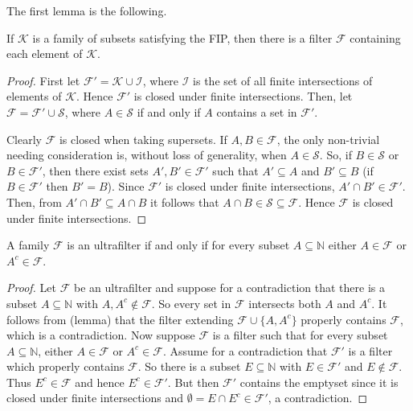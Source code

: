 The first lemma is the following.
\begin{lemma}
 If \( \mathcal{K}  \) is a family of subsets satisfying the FIP, then there is a filter \(  \mathcal{F}  \) containing each element of \( \mathcal{K}  \).
\end{lemma}
\begin{proof}
	First let \( \mathcal{F}' = \mathcal{K} \cup \mathcal{I}  \), where \( \mathcal{I}  \) is the set of all finite intersections of elements of \( \mathcal{K}  \). Hence \( \mathcal{F} ' \) is closed under finite intersections. Then, let \( \mathcal{F} = \mathcal{F}' \cup \mathcal{S}  \), where \( A \in \mathcal{S}  \) if and only if \( A \) contains a set in \( \mathcal{F} ' \).

	Clearly \( \mathcal{F}  \) is closed when taking supersets. If \( A, B \in \mathcal{F}  \), the only non-trivial needing consideration is, without loss of generality, when \( A \in \mathcal{S}  \). So, if \( B \in \mathcal{S}  \) or \( B \in \mathcal{F} ' \), then there exist sets \( A', B' \in \mathcal{F}'  \) such that \( A' \subseteq A \) and \( B' \subseteq B \) (if \( B \in \mathcal{F} ' \) then \( B' = B \)). Since \( \mathcal{F} ' \) is closed under finite intersections, \( A' \cap B' \in \mathcal{F} ' \). Then, from \( A' \cap B' \subseteq A \cap B \) it follows that \( A \cap B \in \mathcal{S} \subseteq \mathcal{F}  \). Hence \( \mathcal{F}  \) is closed under finite intersections.
\end{proof}
\begin{lemma}
A family \( \mathcal{F}  \) is an ultrafilter if and only if for every subset \( A \subseteq \mathbb{N}  \) either \( A \in \mathcal{F}  \) or \( A^{c} \in \mathcal{F}  \).
\end{lemma}
\begin{proof}
Let \( \mathcal{F}  \) be an ultrafilter and suppose for a contradiction that there is a subset \( A \subseteq \mathbb{N}  \) with \( A, A^{c} \notin \mathcal{F}  \). So every set in \( \mathcal{F}  \) intersects both \( A \) and \( A^{c}  \). It follows from (lemma) that the filter extending \( \mathcal{F} \cup \{ A, A^{c}  \}  \) properly contains \( \mathcal{F}  \), which is a contradiction. Now suppose \( \mathcal{F}  \) is a filter such that for every subset \( A \subseteq \mathbb{N}  \), either \( A \in \mathcal{F}  \) or \( A^{c} \in \mathcal{F}  \). Assume for a contradiction that \( \mathcal{F} ' \) is a filter which properly contains \( \mathcal{F}  \). So there is a subset \( E \subseteq \mathbb{N}  \) with \( E \in \mathcal{F} ' \) and \( E \notin \mathcal{F}  \). Thus \( E^{c} \in \mathcal{F}  \) and hence \( E^{c} \in \mathcal{F} ' \). But then \( \mathcal{F} ' \) contains the emptyset since it is closed under finite intersections and \( \emptyset = E \cap E^{c} \in \mathcal{F} ' \), a contradiction.
\end{proof}
